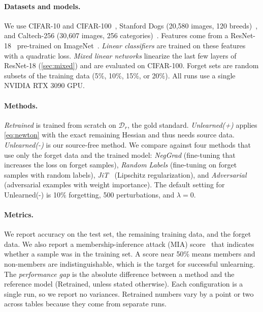\documentclass[10pt,twocolumn,letterpaper]{article}
\newcommand{\Dr}{\mathcal{D}_r}
\begin{document}
\paragraph{Datasets and models.}
We use CIFAR-10 and CIFAR-100~\cite{krizhevsky2009learning}, Stanford Dogs (20,580 images, 120 breeds)~\cite{khosla2011novel}, and Caltech-256 (30,607 images, 256 categories)~\cite{griffin2007caltech}. Features come from a ResNet-18~\cite{he2016deep} pre-trained on ImageNet~\cite{deng2009imagenet}. \emph{Linear classifiers} are trained on these features with a quadratic loss. \emph{Mixed linear networks} linearize the last few layers of ResNet-18 (\cref{sec:mixed}) and are evaluated on CIFAR-100. Forget sets are random subsets of the training data (5\%, 10\%, 15\%, or 20\%). All runs use a single NVIDIA RTX 3090 GPU.

\paragraph{Methods.}
\emph{Retrained} is trained from scratch on $\Dr$, the gold standard. \emph{Unlearned(+)} applies \cref{eq:newton} with the exact remaining Hessian and thus needs source data. \emph{Unlearned(-)} is our source-free method. We compare against four methods that use only the forget data and the trained model: \emph{NegGrad} (fine-tuning that increases the loss on forget samples), \emph{Random Labels} (fine-tuning on forget samples with random labels), \emph{JiT}~\cite{foster2024zero} (Lipschitz regularization), and \emph{Adversarial}~\cite{cha2024learning} (adversarial examples with weight importance). The default setting for Unlearned(-) is 10\% forgetting, 500 perturbations, and $\lambda=0$.

\paragraph{Metrics.}
We report accuracy on the test set, the remaining training data, and the forget data. We also report a membership-inference attack (MIA) score~\cite{shokri2017membership} that indicates whether a sample was in the training set. A score near 50\% means members and non-members are indistinguishable, which is the target for successful unlearning. The \emph{performance gap} is the absolute difference between a method and the reference model (Retrained, unless stated otherwise). Each configuration is a single run, so we report no variances. Retrained numbers vary by a point or two across tables because they come from separate runs.
\end{document}
